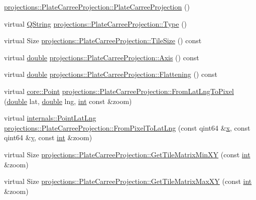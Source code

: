 \begin{DoxyCompactItemize}
\item 
\hyperlink{group___o_p_map_widget_ga931c372d511eb5f902be68e721dea1a1}{projections\-::\-Plate\-Carree\-Projection\-::\-Plate\-Carree\-Projection} ()
\item 
virtual \hyperlink{group___u_a_v_objects_plugin_gab9d252f49c333c94a72f97ce3105a32d}{Q\-String} \hyperlink{group___o_p_map_widget_ga71ab3c89676e92a088c8ac2ce4058142}{projections\-::\-Plate\-Carree\-Projection\-::\-Type} ()
\item 
virtual Size \hyperlink{group___o_p_map_widget_gacf9afa88981c6504040c08c19731ea98}{projections\-::\-Plate\-Carree\-Projection\-::\-Tile\-Size} () const 
\item 
virtual \hyperlink{_super_l_u_support_8h_a8956b2b9f49bf918deed98379d159ca7}{double} \hyperlink{group___o_p_map_widget_ga0917ee78fdc28e179792601c612072e9}{projections\-::\-Plate\-Carree\-Projection\-::\-Axis} () const 
\item 
virtual \hyperlink{_super_l_u_support_8h_a8956b2b9f49bf918deed98379d159ca7}{double} \hyperlink{group___o_p_map_widget_ga9826466bb3f7ed3e3bd1f3a5b8a538d5}{projections\-::\-Plate\-Carree\-Projection\-::\-Flattening} () const 
\item 
virtual \hyperlink{structcore_1_1_point}{core\-::\-Point} \hyperlink{group___o_p_map_widget_ga36e2342a818ea95326dc2100e9f39460}{projections\-::\-Plate\-Carree\-Projection\-::\-From\-Lat\-Lng\-To\-Pixel} (\hyperlink{_super_l_u_support_8h_a8956b2b9f49bf918deed98379d159ca7}{double} lat, \hyperlink{_super_l_u_support_8h_a8956b2b9f49bf918deed98379d159ca7}{double} lng, \hyperlink{ioapi_8h_a787fa3cf048117ba7123753c1e74fcd6}{int} const \&zoom)
\item 
virtual \hyperlink{structinternals_1_1_point_lat_lng}{internals\-::\-Point\-Lat\-Lng} \hyperlink{group___o_p_map_widget_gadd2ce1ff11cbb8b8704013b12cf8865f}{projections\-::\-Plate\-Carree\-Projection\-::\-From\-Pixel\-To\-Lat\-Lng} (const qint64 \&\hyperlink{glext_8h_a1db9d104e3c2128177f26aff7b46982f}{x}, const qint64 \&\hyperlink{glext_8h_a42315f3ed8fff752bb47fd782309fcfc}{y}, const \hyperlink{ioapi_8h_a787fa3cf048117ba7123753c1e74fcd6}{int} \&zoom)
\item 
virtual Size \hyperlink{group___o_p_map_widget_ga5e7a2f9214e18785a5c7c87321caea12}{projections\-::\-Plate\-Carree\-Projection\-::\-Get\-Tile\-Matrix\-Min\-X\-Y} (const \hyperlink{ioapi_8h_a787fa3cf048117ba7123753c1e74fcd6}{int} \&zoom)
\item 
virtual Size \hyperlink{group___o_p_map_widget_ga8523592554481d4a42f407d160ade5cd}{projections\-::\-Plate\-Carree\-Projection\-::\-Get\-Tile\-Matrix\-Max\-X\-Y} (const \hyperlink{ioapi_8h_a787fa3cf048117ba7123753c1e74fcd6}{int} \&zoom)

\end{DoxyCompactItemize}
